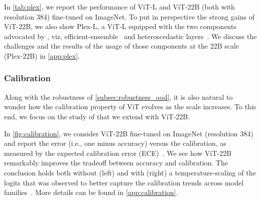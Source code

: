\documentclass{article}
\newcommand{\chonk}{\mbox{ViT-22B}\xspace}
\begin{document}
In \cref{tab:plex}, we report the performance of ViT-L and ViT-22B (both with resolution 384) fine-tuned on ImageNet. 
To put in perspective the strong gains of ViT-22B, we also show Plex-L, a ViT-L equipped with the two components advocated by \citet{tran2022plex}, viz, efficient-ensemble~\citep{wen2019batchensemble} and heteroscedastic layers~\citep{collier2021correlated}.
We discuss the challenges and the results of the usage of those components at the 22B scale (Plex-22B) in \cref{app:plex}.



\begin{table}[t]
    \caption{ViT-22B evaluated on some representative metrics from the Plex reliability benchmark~\citep{tran2022plex}.}
\centering
  \setlength{\tabcolsep}{4pt}
    \label{tab:plex}
\end{table}


\subsubsection{Calibration}
\label{subsec:calibration}
Along with the robustness of \cref{subsec:robustness_ood}, it is also natural to wonder how the calibration property of ViT evolves as the scale increases. To this end, we focus on the study of \citet{minderer2021revisiting} that we extend with \chonk.

In \cref{fig:calibration}, we consider \chonk fine-tuned on ImageNet (resolution 384) and report the error (i.e., one minus accuracy) versus the calibration, as measured by the expected calibration error (ECE)~\citep{naeini2015obtaining,guo2017calibration}.
We see how \chonk remarkably improves the tradeoff between accuracy and calibration. The conclusion holds both without (left) and with (right) a temperature-scaling of the logits that was observed to better capture the calibration trends across model families~\citep{minderer2021revisiting}. More details can be found in \cref{app:calibration}.
\end{document}
